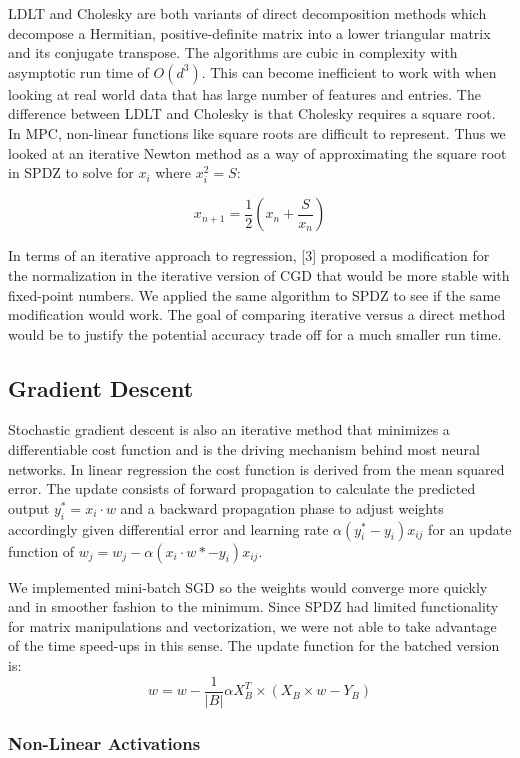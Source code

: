 \documentclass{article}
\begin{document}
LDLT and Cholesky are both variants of direct decomposition methods which decompose a Hermitian, positive-definite matrix into a lower triangular matrix and its conjugate transpose. The algorithms are cubic in complexity with asymptotic run time of $O(d^3)$. This can become inefficient to work with when looking at real world data that has large number of features and entries. The difference between LDLT and Cholesky is that Cholesky requires a square root. In MPC, non-linear functions like square roots are difficult to represent. Thus we looked at an iterative Newton method as a way of approximating the square root in SPDZ to solve for $x_i$ where $x_{i}^2 = S$:

\[
x_{n+1} = \frac{1}{2} (x_{n} + \frac{S}{x_{n}})
\]

In terms of an iterative approach to regression, [3] proposed a modification for the normalization in the iterative version of CGD that would be more stable with fixed-point numbers. We applied the same algorithm to SPDZ to see if the same modification would work. The goal of comparing iterative versus a direct method would be to justify the potential accuracy trade off for a much smaller run time.

\subsection{Gradient Descent}

Stochastic gradient descent is also an iterative method that minimizes a differentiable cost function and is the driving mechanism behind most neural networks. In linear regression the cost function is derived from the mean squared error. The update consists of forward propagation to calculate the predicted output $y_i^* = x_i \cdot w$ and a backward propagation phase to adjust weights accordingly given differential error and learning rate $\alpha(y_i^*-y_i)x_{ij}$ for an update function of $w_j = w_j  - \alpha(x_i \cdot w *-y_i)x_{ij}$.

We implemented mini-batch SGD so the weights would converge more quickly and in smoother fashion to the minimum. Since SPDZ had limited functionality for matrix manipulations and vectorization, we were not able to take advantage of the time speed-ups in this sense. The update function for the batched version is: 
\[
 w = w - \frac{1}{|B|} \alpha X^{T}_{B} \times (X_{B} \times w - Y_{B})
\]

\subsubsection{Non-Linear Activations}
\end{document}
